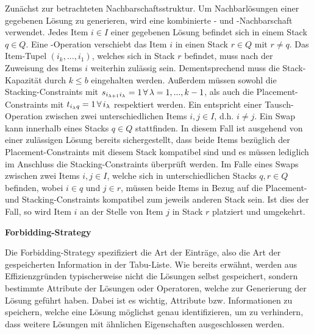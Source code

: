Zunächst zur betrachteten Nachbarschaftsstruktur. Um Nachbarlösungen einer gegebenen Lösung zu generieren,
wird eine kombinierte - und -Nachbarschaft verwendet.
Jedes Item $i \in I$ einer gegebenen Lösung befindet sich in einem Stack $q \in Q$.
Eine -Operation verschiebt das Item $i$ in einen Stack $r \in Q$ mit $r \neq q$.
Das Item-Tupel $(i_k, ..., i_1)$, welches sich in Stack $r$ befindet, muss nach der Zuweisung des Items $i$
weiterhin zulässig sein. Dementsprechend muss die Stack-Kapazität durch $k \leq b$ eingehalten werden.
Außerdem müssen sowohl die Stacking-Constraints mit $s_{i_{\lambda + 1}i_\lambda} = 1 \thinspace \forall \thinspace
\lambda = 1, ..., k - 1$, als auch die Placement-Constraints mit $t_{i_\lambda q} = 1 \thinspace \forall
\thinspace i_\lambda$ respektiert werden.
Ein  entspricht einer Tausch-Operation zwischen zwei unterschiedlichen Items $i, j \in I$,
d.h. $i \neq j$. Ein Swap kann innerhalb eines Stacks $q \in Q$ stattfinden. In diesem Fall ist ausgehend von einer zulässigen Lösung
bereits sichergestellt, dass beide Items bezüglich der Placement-Constraints mit diesem Stack kompatibel sind und es müssen lediglich
im Anschluss die Stacking-Constraints überprüft werden. Im Falle eines Swaps zwischen zwei Items $i, j \in I$, welche sich in unterschiedlichen Stacks $q, r \in Q$ befinden, wobei $i \in q$ und $j \in r$, müssen beide Items in Bezug auf die Placement- und Stacking-Constraints kompatibel zum jeweils anderen Stack sein. Ist dies der Fall, so wird Item $i$ an der Stelle von Item $j$ in Stack $r$ platziert und umgekehrt.

\textbf{Forbidding-Strategy}

Die Forbidding-Strategy spezifiziert die Art der Einträge, also die Art der gespeicherten Information in der
Tabu-Liste. Wie bereits erwähnt, werden aus Effizienzgründen typischerweise nicht die Lösungen selbst gespeichert,
sondern bestimmte Attribute der Lösungen oder Operatoren, welche zur Generierung der Lösung geführt haben.
Dabei ist es wichtig, Attribute bzw. Informationen zu speichern, welche eine Lösung möglichst genau identifizieren,
um zu verhindern, dass weitere Lösungen mit ähnlichen Eigenschaften ausgeschlossen werden.

